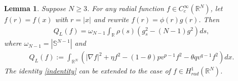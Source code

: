 \documentclass{article}
\newtheorem{lemma}[theorem]{Lemma}
\theoremstyle{definition} \theoremstyle{remark}
\numberwithin{equation}{section}
\newcommand{\R}{\mathbb{R}}
\begin{document}
	\begin{lemma} \label{lemtransformation}
		Suppose $N \ge 3$. For any radial function $f \in C_c^\infty(\R^N)$, let $f(r) = f(x)$ with $r = |x|$ and rewrite $f(r) = \phi(r)g(r)$. Then
		\begin{align} \label{indentity}
			Q_L(f) = \omega_{N-1} \int_{\R} \rho(s)\left(g_s^2 - (N-1)g^2\right)ds,
		\end{align}
		where $\omega_{N-1} = |\mathbb{S}^{N-1}|$ and
		\begin{align*}
			Q_L(f) := \int_{\R^N}\left(|\nabla f|^2 + \eta f^2 - (1-\theta)pv^{p-1}f^2 - \theta qv^{q-1}f^2\right)dx.
		\end{align*}
		The identity \eqref{indentity} can be extended to the case of $f \in H^1_{rad}(\R^N)$.
	\end{lemma}
\end{document}

